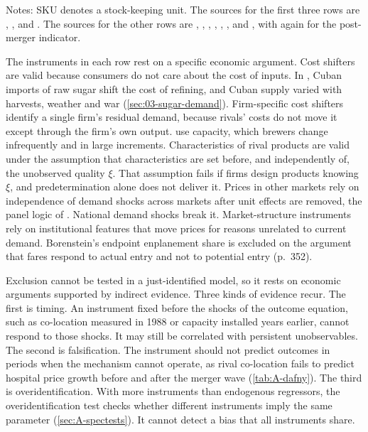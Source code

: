 \begin{table}[htbp]
\smallskip
\begin{minipage}{0.92\textwidth}\footnotesize
Notes: SKU denotes a stock-keeping unit. The sources for the first three rows are \citet{GenesoveMullin1998},
\citet[p.~1775]{MillerWeinberg2017}, \citet{BakerBresnahan1988} and \citet{Bresnahan1982}. The sources for the other rows are
\citet{BerryLevinsohnPakes1995}, \citet{GandhiHoude2019}, \citet{Hausman1997}, \citet{Nevo2001}, \citet{Bresnahan1997},
\citet{ChaudhuriGoldbergJia2006}, \citet{Dafny2009} and \citet{Borenstein1989}, with \citet{MillerWeinberg2017} again
for the post-merger indicator.
\end{minipage}
\end{table}

The instruments in each row rest on a specific economic argument. Cost shifters are valid because consumers
do not care about the cost of inputs. In \citet{GenesoveMullin1998}, Cuban imports of raw sugar shift the
cost of refining, and Cuban supply varied with harvests, weather and war (\cref{sec:03-sugar-demand}).
Firm-specific cost shifters identify a single firm's residual demand, because rivals' costs do not move
it except through the firm's own output. \citet{BakerBresnahan1988} use capacity, which brewers change
infrequently and in large increments. Characteristics of rival products are valid under the assumption that
characteristics are set before, and independently of, the unobserved quality $\xi$. That assumption fails if
firms design products knowing $\xi$, and predetermination alone does not deliver it. Prices in other
markets rely on independence of demand shocks across markets after unit effects are removed, the panel logic
of \citet{HausmanTaylor1981}. National demand shocks break it. Market-structure instruments rely on
institutional features that move prices for reasons unrelated to current demand. Borenstein's endpoint
enplanement share is excluded on the argument that fares respond to actual entry and not to potential entry
(p.~352).

Exclusion cannot be tested in a just-identified model, so it rests on economic arguments supported by
indirect evidence. Three kinds of evidence recur. The first is timing. An instrument fixed before the shocks of
the outcome equation, such as co-location measured in 1988 or capacity installed years earlier, cannot
respond to those shocks. It may still be correlated with persistent unobservables. The second is
falsification. The instrument should not predict outcomes in periods when the mechanism cannot operate, as
rival co-location fails to predict hospital price growth before and after the merger wave (\cref{tab:A-dafny}).
The third is overidentification. With more instruments than endogenous regressors, the overidentification
test checks whether different instruments imply the same parameter (\cref{sec:A-spectests}). It cannot detect
a bias that all instruments share.

